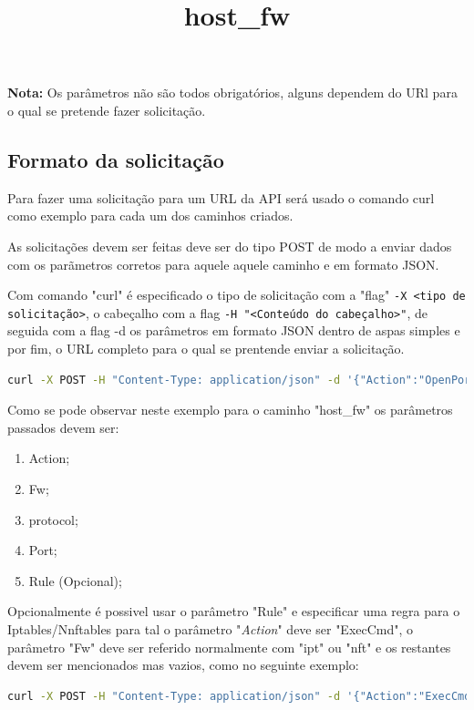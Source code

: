 \textbf{Nota:} Os parâmetros não são todos obrigatórios, alguns dependem do URl para o qual
se pretende fazer solicitação.


\subsection{Formato da solicitação}

Para fazer uma solicitação para um URL da API será usado o comando curl como exemplo para
cada um dos caminhos criados.

As solicitações devem ser feitas deve ser do tipo POST de modo a enviar dados com os parãmetros
corretos para aquele aquele caminho e em formato JSON.

Com comando "curl" é especificado o tipo de solicitação com a "flag" \texttt{-X <tipo de solicitação>},
o cabeçalho com a flag \texttt{-H "<Conteúdo do cabeçalho>"}, de seguida com a flag -d os parâmetros
em formato JSON dentro de aspas simples e por fim, o URL completo para o qual se prentende enviar a
solicitação.



\title*{\textbf{host\_fw}}

\begin{lstlisting}[language=Bash, caption={Exemplo de solicitação para a firewal do sistema host}]
    curl -X POST -H "Content-Type: application/json" -d '{"Action":"OpenPort","Fw":"ipt", "Protocol":"tcp","Port":"22"}' http://localhost:5000/host_fw
\end{lstlisting}

Como se pode observar neste exemplo para o caminho "host\_fw" os parâmetros passados devem ser:

\begin{enumerate}
    \item Action;
    \item Fw;
    \item protocol;
    \item Port;
    \item Rule (Opcional);
\end{enumerate}

Opcionalmente é possivel usar o parâmetro "Rule" e especificar uma regra para o Iptables\slash Nnftables
para tal o parâmetro "\textit{Action}" deve ser "ExecCmd", o parâmetro "Fw" deve ser referido normalmente com "ipt" ou "nft" e os restantes devem ser mencionados mas vazios, como no seguinte exemplo:

\begin{lstlisting}[language=Bash, caption={Exemplo de solicitação para a firewal do sistema host com uma regra personalizada}]
    curl -X POST -H "Content-Type: application/json" -d '{"Action":"ExecCmd","Fw":"ipt", "Protocol":"","Port":"", "Rule":"INPUT -s 192.168.1.140 -j DROP"}' http://localhost:5000/host_fw
\end{lstlisting}



